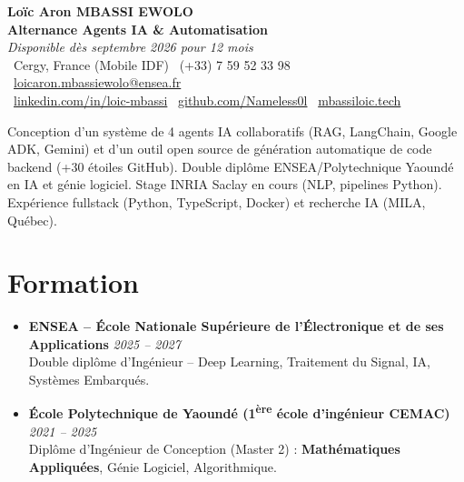 \documentclass[a4paper,11pt]{article}
\begin{document}
\begin{center}
    {\Large \textbf{Loïc Aron MBASSI EWOLO}} \\ \vspace{4pt}
    \textbf{\large Alternance Agents IA \& Automatisation} \\
    \textit{\small Disponible dès septembre 2026 pour 12 mois} \\ \vspace{4pt}
    \small
    \faMapMarker\ Cergy, France (Mobile IDF) \quad
    \faPhone\ (+33) 7 59 52 33 98 \quad
    {\color{primary}\faEnvelope\ \href{mailto:loicaron.mbassiewolo@ensea.fr}{loicaron.mbassiewolo@ensea.fr}} \\ \vspace{2pt}
    {\color{primary}\faLinkedin\ \href{https://www.linkedin.com/in/loic-mbassi/}{linkedin.com/in/loic-mbassi}} \quad
    {\color{primary}\faGithub\ \href{https://github.com/Nameless0l}{github.com/Nameless0l}} \quad
    {\color{primary}\faGlobe\ \href{https://mbassiloic.tech}{mbassiloic.tech}}
\end{center}

\vspace{-6pt}

\noindent\small{Conception d'un système de 4 agents IA collaboratifs (RAG, LangChain, Google ADK, Gemini) et d'un outil open source de génération automatique de code backend (+30 étoiles GitHub). Double diplôme ENSEA/Polytechnique Yaoundé en IA et génie logiciel. Stage INRIA Saclay en cours (NLP, pipelines Python). Expérience fullstack (Python, TypeScript, Docker) et recherche IA (MILA, Québec).}

\section{Formation}
\begin{itemize}[leftmargin=*, label=\tiny$\bullet$, nosep]
    \item \textbf{ENSEA -- École Nationale Supérieure de l'Électronique et de ses Applications} \hfill \textit{2025 -- 2027} \\
    \small{Double diplôme d'Ingénieur -- Deep Learning, Traitement du Signal, IA, Systèmes Embarqués.}
    \item \textbf{École Polytechnique de Yaoundé (1\textsuperscript{ère} école d'ingénieur CEMAC)} \hfill \textit{2021 -- 2025} \\
    \small{Diplôme d'Ingénieur de Conception (Master 2) : \textbf{Mathématiques Appliquées}, Génie Logiciel, Algorithmique.}
\end{itemize}
\end{document}
